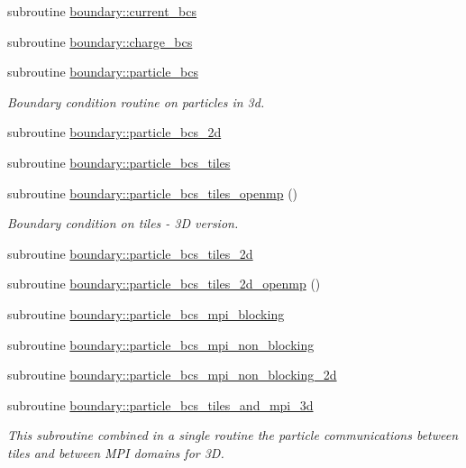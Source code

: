 \begin{DoxyCompactItemize}
\item 
subroutine \hyperlink{namespaceboundary_a2bd382bbf256b1208d4fd3721c37ad08}{boundary\+::current\+\_\+bcs}
\item 
subroutine \hyperlink{namespaceboundary_a0b6d77029b51dd2a0e853c265885ab6c}{boundary\+::charge\+\_\+bcs}
\item 
subroutine \hyperlink{namespaceboundary_a9e7ba00d025d595683607b3ccd95bcb3}{boundary\+::particle\+\_\+bcs}
\begin{DoxyCompactList}\small\item\em Boundary condition routine on particles in 3d. \end{DoxyCompactList}\item 
subroutine \hyperlink{namespaceboundary_aad89819169dca0b0ae8cf04748a86fb1}{boundary\+::particle\+\_\+bcs\+\_\+2d}
\item 
subroutine \hyperlink{namespaceboundary_added6cf2ea0ffc7ab618c3d9af16fade}{boundary\+::particle\+\_\+bcs\+\_\+tiles}
\item 
subroutine \hyperlink{namespaceboundary_af6d7a140eef6818609e44869b67cd3a7}{boundary\+::particle\+\_\+bcs\+\_\+tiles\+\_\+openmp} ()
\begin{DoxyCompactList}\small\item\em Boundary condition on tiles -\/ 3D version. \end{DoxyCompactList}\item 
subroutine \hyperlink{namespaceboundary_afb4e6ab09e288dab2bb9ce2d731e276f}{boundary\+::particle\+\_\+bcs\+\_\+tiles\+\_\+2d}
\item 
subroutine \hyperlink{namespaceboundary_a9f9517df19ef503bb2a69e63aeec91d4}{boundary\+::particle\+\_\+bcs\+\_\+tiles\+\_\+2d\+\_\+openmp} ()
\item 
subroutine \hyperlink{namespaceboundary_a1789d63402ac897697791a2fca4fa8e6}{boundary\+::particle\+\_\+bcs\+\_\+mpi\+\_\+blocking}
\item 
subroutine \hyperlink{namespaceboundary_aac32f7f65f1998963706f9d5776d29d2}{boundary\+::particle\+\_\+bcs\+\_\+mpi\+\_\+non\+\_\+blocking}
\item 
subroutine \hyperlink{namespaceboundary_a3293856926030dfea9e8ca05c61e1a5a}{boundary\+::particle\+\_\+bcs\+\_\+mpi\+\_\+non\+\_\+blocking\+\_\+2d}
\item 
subroutine \hyperlink{namespaceboundary_ac117306978e83b787afba90c3ac038f4}{boundary\+::particle\+\_\+bcs\+\_\+tiles\+\_\+and\+\_\+mpi\+\_\+3d}
\begin{DoxyCompactList}\small\item\em This subroutine combined in a single routine the particle communications between tiles and between M\+PI domains for 3D. \end{DoxyCompactList}\end{DoxyCompactItemize}
